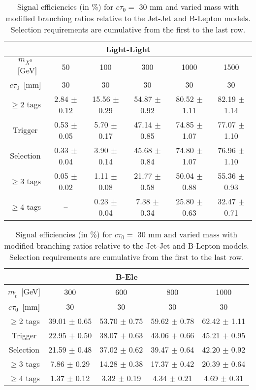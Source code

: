 \begin{table}[tb]
  \caption{ Signal efficiencies (in \%) for  $c\tau_0=$ 30 mm and
   varied mass with modified branching ratios relative 
   to the Jet-Jet and B-Lepton models. Selection requirements are cumulative from
    the first to the last row.\label{tab:cutflow_BR_mass}}
\begin{center}
\begin{tabular}{cccccc} 
\multicolumn{6}{c}{\textbf{Light-Light}} \\
 \hline 
 $m_{X^0}$~[GeV] & 50 & 100 & 300 & 1000 & 1500 \\ 
 $c\tau_0$~[mm] & 30 & 30 & 30 & 30 & 30 \\ 
 \hline 
 $\geq 2$ tags & 2.84 $\pm$ 0.12   & 15.56 $\pm$ 0.29  & 54.87 $\pm$ 0.92 & 80.52 $\pm$ 1.11 & 82.19 $\pm$ 1.14 \\ 
 Trigger       & 0.53 $\pm$ 0.05 & 5.70 $\pm$ 0.17   & 47.14 $\pm$ 0.85 & 74.85 $\pm$ 1.07 & 77.07 $\pm$ 1.10 \\ 
 Selection     & 0.33 $\pm$ 0.04 & 3.90 $\pm$ 0.14   & 45.68 $\pm$ 0.84 & 74.80 $\pm$ 1.07 & 76.96 $\pm$ 1.10 \\ 
 $\geq 3$ tags & 0.05 $\pm$ 0.02 & 1.11 $\pm$ 0.08   & 21.77 $\pm$ 0.58 & 50.04 $\pm$ 0.88 & 55.36 $\pm$ 0.93 \\ 
 $\geq 4$ tags & --                & 0.23 $\pm$ 0.04 & 7.38 $\pm$ 0.34  & 25.80 $\pm$ 0.63 & 32.47 $\pm$ 0.71 \\ 
\end{tabular}

\begin{tabular}{ccccc} 
\multicolumn{5}{c}{\textbf{B-Ele}} \\
 \hline 
 $m_{\tilde{t}}$~[GeV] & 300 & 600 & 800 & 1000 \\ 
 $c\tau_0$~[mm] & 30 & 30 & 30 & 30 \\ 
\hline 
        $\geq 2$ tags     & 39.01 $\pm$ 0.65 & 53.70 $\pm$ 0.75 & 59.62 $\pm$ 0.78 & 62.42 $\pm$ 1.11 \\ 
         Trigger          & 22.95 $\pm$ 0.50 & 38.07 $\pm$ 0.63 & 43.06 $\pm$ 0.66 & 45.21 $\pm$ 0.95 \\ 
          Selection       & 21.59 $\pm$ 0.48 & 37.02 $\pm$ 0.62 & 39.47 $\pm$ 0.64 & 42.20 $\pm$ 0.92 \\ 
           $\geq 3$ tags  & 7.86 $\pm$ 0.29  & 14.28 $\pm$ 0.38 & 17.37 $\pm$ 0.42 & 20.39 $\pm$ 0.64 \\ 
            $\geq 4$ tags & 1.37 $\pm$ 0.12  & 3.32 $\pm$ 0.19  & 4.34 $\pm$ 0.21  & 4.69 $\pm$ 0.31  \\ 
\end{tabular}


\end{center}
\end{table}
